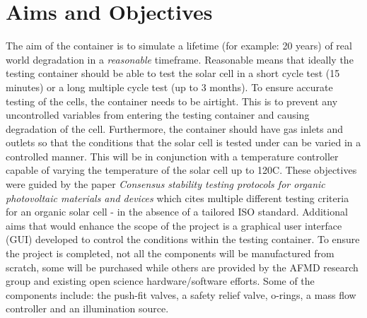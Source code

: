 \documentclass[a4paper,11pt]{article}
\begin{document}
\section{Aims and Objectives}
The aim of the container is to simulate a lifetime (for example: 20 years) of real world degradation in a \emph{reasonable} timeframe. Reasonable means that ideally the testing container should be able to test the solar cell in a short cycle test (15 minutes) or a long multiple cycle test (up to 3 months). To ensure accurate testing of the cells, the container needs to be airtight. This is to prevent any uncontrolled variables from entering the testing container and causing degradation of the cell. Furthermore, the container should have gas inlets and outlets so that the conditions that the solar cell is tested under can be varied in a controlled manner. This will be in conjunction with a temperature controller capable of varying the temperature of the solar cell up to 120\textdegree C. These objectives were guided by the paper \emph{Consensus stability testing protocols for organic photovoltaic materials and devices} \cite[p.~1255-1261]{RN47} which cites multiple different testing criteria for an organic solar cell - in the absence of a tailored ISO standard. Additional aims that would enhance the scope of the project is a graphical user interface (GUI) developed to control the conditions within the testing container. To ensure the project is completed, not all the components will be manufactured from scratch, some will be purchased while others are provided by the AFMD research group and existing open science hardware/software efforts. Some of the components include: the push-fit valves, a safety relief valve, o-rings, a mass flow controller and an illumination source.
\end{document}
